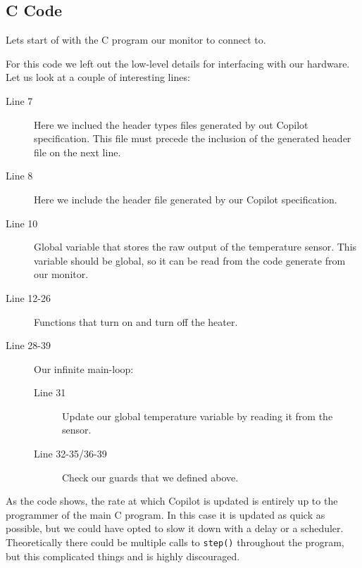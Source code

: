 \subsection{C Code}
Lets start of with the C program our monitor to connect to.


%
%
%
%
%
%
%

For this code we left out the low-level details for interfacing with our
hardware. Let us look at a couple of interesting lines:

\begin{description}
  \item[Line 7] Here we inclued the header types files generated by out Copilot
  specification. This file must precede the inclusion of the generated header
  file on the next line. 
  \item[Line 8] Here we include the header file generated by our Copilot
  specification.
  \item[Line 10] Global variable that stores the raw output of the temperature
  sensor. This variable should be global, so it can be read from the code
  generate from our monitor.
  \item[Line 12-26] Functions that turn on and turn off the
  heater.
  \item[Line 28-39] Our infinite main-loop:
    \begin{description}
      \item[Line 31] Update our global temperature variable by reading it from
      the sensor.
      \item[Line 32-35/36-39] Check our guards that we defined above.
    \end{description}
\end{description}

As the code shows, the rate at which Copilot is updated is entirely up to the
programmer of the main C program. In this case it is updated as quick as
possible, but we could have opted to slow it down with a delay or a scheduler.
Theoretically there could be multiple calls to \texttt{step()} throughout the
program, but this complicated things and is highly discouraged.


